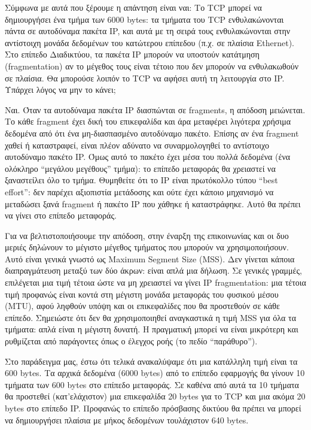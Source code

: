 Σύμφωνα με αυτά που ξέρουμε η απάντηση είναι ναι: Το TCP μπορεί να δημιουργήσει ένα τμήμα των 6000 bytes: τα τμήματα του TCP ενθυλακώνονται πάντα σε αυτοδύναμα πακέτα IP, και αυτά με τη σειρά τους ενθυλακώνονται στην αντίστοιχη μονάδα δεδομένων του κατώτερου επίπεδου (π.χ. σε πλαίσια Ethernet). Στο επίπεδο Διαδικτύου, τα πακέτα IP μπορούν να υποστούν κατάτμηση (fragmentation) αν το μέγεθος τους είναι τέτοιο που δεν μπορούν να ενθυλακωθούν σε πλαίσια. Θα μπορούσε λοιπόν το TCP να αφήσει αυτή τη λειτουργία στο IP. Υπάρχει λόγος να μην το κάνει;

Ναι. Όταν τα αυτοδύναμα πακέτα IP διασπώνται σε fragments, η απόδοση μειώνεται. Το κάθε fragment έχει δική του επικεφαλίδα και άρα μεταφέρει λιγότερα χρήσιμα δεδομένα από ότι ένα μη-διασπασμένο αυτοδύναμο πακέτο. Επίσης αν ένα fragment χαθεί ή καταστραφεί, είναι πλέον αδύνατο να συναρμολογηθεί το αντίστοιχο αυτοδύναμο πακέτο IP. Όμως αυτό το πακέτο έχει μέσα του πολλά δεδομένα (ένα ολόκληρο ``μεγάλου μεγέθους'' τμήμα): το επίπεδο μεταφοράς θα χρειαστεί να ξαναστείλει όλο το τμήμα. Θυμηθείτε ότι το IP είναι πρωτόκολλο τύπου ``best effort'': δεν παρέχει αξιοπιστία μετάδοσης και ούτε έχει κάποιο μηχανισμό να μεταδώσει ξανά fragment ή πακέτο IP που χάθηκε ή καταστράφηκε. Αυτό θα πρέπει να γίνει στο επίπεδο μεταφοράς.

Για να βελτιστοποιήσουμε την απόδοση, στην έναρξη της επικοινωνίας και οι δυο μεριές δηλώνουν το μέγιστο μέγεθος τμήματος που μπορούν να χρησιμοποιήσουν. Αυτό είναι γενικά γνωστό ως Maximum Segment Size (MSS). Δεν γίνεται κάποια διαπραγμάτευση μεταξύ των δύο άκρων: είναι απλά μια δήλωση. Σε γενικές γραμμές, επιλέγεται μια τιμή τέτοια ώστε να μη χρειαστεί να γίνει IP fragmentation: μια τέτοια τιμή προφανώς είναι κοντά στη μέγιστη μονάδα μεταφοράς του φυσικού μέσου (MTU), αφού ληφθούν υπόψη και οι επικεφαλίδες που θα προστεθούν σε κάθε επίπεδο. Σημειώστε ότι δεν θα χρησιμοποιηθεί αναγκαστικά η τιμή MSS για όλα τα τμήματα: απλά είναι η μέγιστη δυνατή. Η πραγματική μπορεί να είναι μικρότερη και ρυθμίζεται από παράγοντες όπως ο έλεγχος ροής (το πεδίο ``παράθυρο'').

Στο παράδειγμα μας, έστω ότι τελικά ανακαλύψαμε ότι μια κατάλληλη τιμή είναι τα 600 bytes. Τα αρχικά δεδομένα (6000 bytes) από το επίπεδο εφαρμογής θα γίνουν 10 τμήματα των 600 bytes στο επίπεδο μεταφοράς. Σε καθένα από αυτά τα 10 τμήματα θα προστεθεί (κατ'ελάχιστον) μια επικεφαλίδα 20 bytes για το TCP και μια ακόμα 20 bytes στο επίπεδο IP. Προφανώς το επίπεδο πρόσβασης δικτύου θα πρέπει να μπορεί να δημιουργήσει πλαίσια με μήκος δεδομένων τουλάχιστον 640 bytes.

